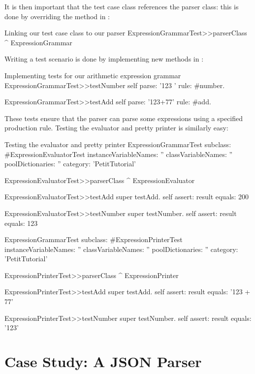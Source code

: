 \documentclass[a4paper,10pt,twoside]{book}
\begin{document}
It is then important that the test case class references the parser
class: this is done by overriding the
 method in
:

\begin{script}{Linking our test case class to our parser}
ExpressionGrammarTest>>parserClass
  ^ ExpressionGrammar
\end{script}

Writing a test scenario is done by implementing new methods in
:

\begin{script}{Implementing tests for our arithmetic expression grammar}
ExpressionGrammarTest>>testNumber
  self parse: '123 ' rule: #number.

ExpressionGrammarTest>>testAdd
  self parse: '123+77' rule: #add.
\end{script}

These tests ensure that the  parser can parse
some expressions using a specified production rule. Testing the
evaluator and pretty printer is similarly easy:

\begin{script}{Testing the evaluator and pretty printer}
ExpressionGrammarTest subclass: #ExpressionEvaluatorTest
  instanceVariableNames: ''
  classVariableNames: ''
  poolDictionaries: ''
  category: 'PetitTutorial'

ExpressionEvaluatorTest>>parserClass
  ^ ExpressionEvaluator

ExpressionEvaluatorTest>>testAdd
  super testAdd.
  self assert: result equals: 200

ExpressionEvaluatorTest>>testNumber
  super testNumber.
  self assert: result equals: 123

ExpressionGrammarTest subclass: #ExpressionPrinterTest
  instanceVariableNames: ''
  classVariableNames: ''
  poolDictionaries: ''
  category: 'PetitTutorial'

ExpressionPrinterTest>>parserClass
  ^ ExpressionPrinter

ExpressionPrinterTest>>testAdd
  super testAdd.
  self assert: result equals: '123 + 77'

ExpressionPrinterTest>>testNumber
  super testNumber.
  self assert: result equals: '123'
\end{script}

\section{Case Study: A JSON Parser}
\end{document}
